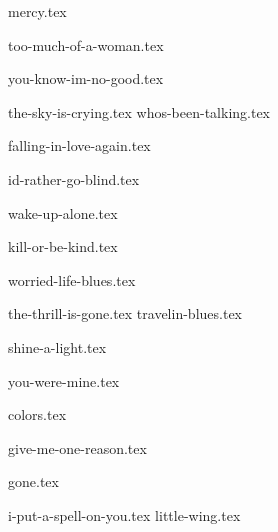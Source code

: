 \begin{songs}{}

  {mercy.tex}
  \sclearpage

  {too-much-of-a-woman.tex}
  \sclearpage

  {you-know-im-no-good.tex}
  \sclearpage

  {the-sky-is-crying.tex}
  {whos-been-talking.tex}

  \sclearpage

  {falling-in-love-again.tex}  
  \sclearpage

  {id-rather-go-blind.tex}  
  \sclearpage
  
  {wake-up-alone.tex}
  \sclearpage
  
  {kill-or-be-kind.tex}
  \sclearpage
  
  {worried-life-blues.tex}
  \sclearpage

  {the-thrill-is-gone.tex}
  {travelin-blues.tex}

  \sclearpage

  {shine-a-light.tex}  
  \sclearpage

  {you-were-mine.tex}
  \sclearpage

  {colors.tex}
  \sclearpage

  {give-me-one-reason.tex}
  \sclearpage

  {gone.tex}
  \sclearpage

  {i-put-a-spell-on-you.tex}
  {little-wing.tex}
  
 \end{songs}

